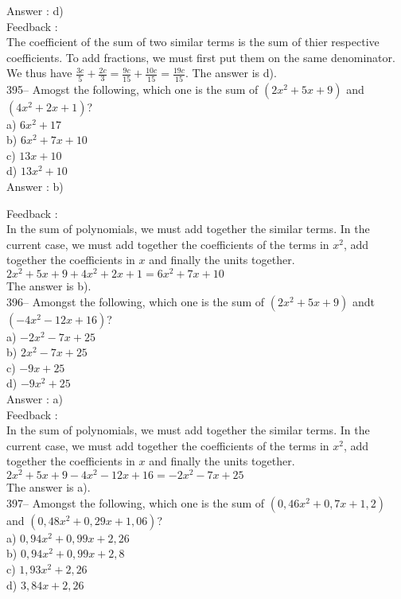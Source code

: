 \documentclass[letterpaper, 12pt]{article}
\begin{document}
Answer : d)\\

Feedback : \\
The coefficient of the sum of two similar terms is the sum of thier respective coefficients. To add fractions, we must first put them on the same denominator. \\[2mm]
We thus have
$\frac{3c}{5}+\frac{2c}{3}=\frac{9c}{15}+\frac{10c}{15}=\frac{19c}{15}$. The answer is d).\\

395-- Amogst the following, which one is the sum of
$(2x^{2}+5x+9)$ and $(4x^{2}+2x+1)$?\\
a) $6x^{2}+17$\\
b) $6x^{2}+7x+10$\\
c) $13x+10$\\
d) $13x^{2}+10$\\

Answer : b)

Feedback : \\
In the sum of polynomials, we must add together the similar terms. In the current case, we must add together the coefficients of the terms in $x^{2}$, add together the coefficients in $x$ and finally the units together.\\
$2x^{2}+5x+9 + 4x^{2}+2x+1 = 6x^{2}+7x+10$\\
The answer is b).\\

396-- Amongst the following, which one is the sum of
$(2x^{2}+5x+9)$ andt $(-4x^{2}-12x+16)$?\\
a) $-2x^{2}-7x+25$\\
b) $2x^{2}-7x+25$\\
c) $-9x+25$\\
d) $-9x^{2}+25$\\

Answer : a)\\

Feedback : \\
In the sum of polynomials, we must add together the similar terms. In the current case, we must add together the coefficients of the terms in $x^{2}$, add together the coefficients in $x$ and finally the units together.\\
$2x^{2}+5x+9 -4x^{2}-12x+16 = -2x^{2}-7x+25$\\
The answer is a).\\

397-- Amongst the following, which one is the sum of
$(0,46x^{2}+0,7x+1,2)$ and $(0,48x^{2}+0,29x+1,06)$?\\
a) $0,94x^{2}+0,99x+2,26$ \\
b) $0,94x^{2}+0,99x+2,8$ \\
c) $1,93x^{2}+2,26$\\
d) $3,84x+2,26$\\
\end{document}
